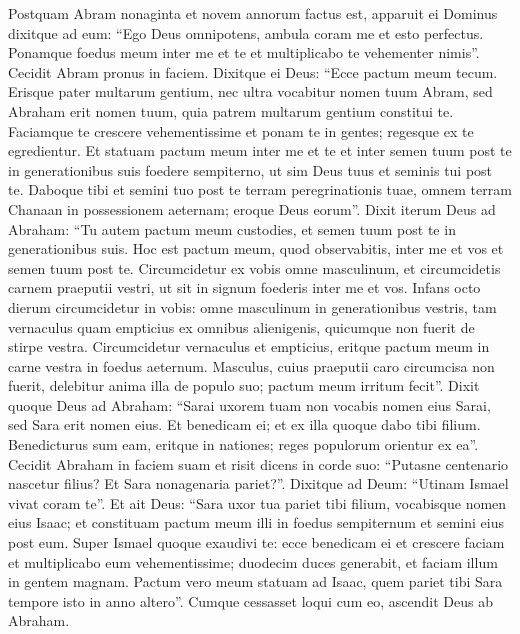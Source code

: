 \begin{biblechapter}
\begin{biblechapter}
\begin{biblechapter}
\begin{biblechapter}
\begin{biblechapter}
\begin{biblechapter}
\begin{biblechapter}
\begin{biblechapter}
\begin{biblechapter}
\begin{biblechapter}
\begin{biblechapter}
\begin{biblechapter}
\begin{biblechapter}
\begin{biblechapter}
\begin{biblechapter}
\begin{biblechapter}
\begin{biblechapter}
\verse Postquam Abram nonaginta et novem annorum factus est, apparuit ei Dominus dixitque ad eum: “Ego Deus omnipotens, ambula coram me et esto perfectus. 
\verse Ponamque foedus meum inter me et te et multiplicabo te vehementer nimis”. 
\verse Cecidit Abram pronus in faciem. 
\verse Dixitque ei Deus: “Ecce pactum meum tecum. Erisque pater multarum gentium, 
\verse nec ultra vocabitur nomen tuum Abram, sed Abraham erit nomen tuum, quia patrem multarum gentium constitui te. 
\verse Faciamque te crescere vehementissime et ponam te in gentes; regesque ex te egredientur. 
\verse Et statuam pactum meum inter me et te et inter semen tuum post te in generationibus suis foedere sempiterno, ut sim Deus tuus et seminis tui post te. 
\verse Daboque tibi et semini tuo post te terram peregrinationis tuae, omnem terram Chanaan in possessionem aeternam; eroque Deus eorum”.
 \verse Dixit iterum Deus ad Abraham: “Tu autem pactum meum custodies, et semen tuum post te in generationibus suis. 
\verse Hoc est pactum meum, quod observabitis, inter me et vos et semen tuum post te. Circumcidetur ex vobis omne masculinum, 
 \verse et circumcidetis carnem praeputii vestri, ut sit in signum foederis inter me et vos. 
\verse Infans octo dierum circumcidetur in vobis: omne masculinum in generationibus vestris, tam vernaculus quam empticius ex omnibus alienigenis, quicumque non fuerit de stirpe vestra. 
\verse Circumcidetur vernaculus et empticius, eritque pactum meum in carne vestra in foedus aeternum. \verse Masculus, cuius praeputii caro circumcisa non fuerit, delebitur anima illa de populo suo; pactum meum irritum fecit”.
 \verse Dixit quoque Deus ad Abraham: “Sarai uxorem tuam non vocabis nomen eius Sarai, sed Sara erit nomen eius. 
\verse Et benedicam ei; et ex illa quoque dabo tibi filium. Benedicturus sum eam, eritque in nationes; reges populorum orientur ex ea”. 
\verse Cecidit Abraham in faciem suam et risit dicens in corde suo: “Putasne centenario nascetur filius? Et Sara nonagenaria pariet?”. 
\verse Dixitque ad Deum: “Utinam Ismael vivat coram te”. 
\verse Et ait Deus: “Sara uxor tua pariet tibi filium, vocabisque nomen eius Isaac; et constituam pactum meum illi in foedus sempiternum et semini eius post eum. 
\verse Super Ismael quoque exaudivi te: ecce benedicam ei et crescere faciam et multiplicabo eum vehementissime; duodecim duces generabit, et faciam illum in gentem magnam. 
 \verse Pactum vero meum statuam ad Isaac, quem pariet tibi Sara tempore isto in anno altero”. 
\verse Cumque cessasset loqui cum eo, ascendit Deus ab Abraham.

\end{biblechapter}
\end{biblechapter}
\end{biblechapter}
\end{biblechapter}
\end{biblechapter}
\end{biblechapter}
\end{biblechapter}
\end{biblechapter}
\end{biblechapter}
\end{biblechapter}
\end{biblechapter}
\end{biblechapter}
\end{biblechapter}
\end{biblechapter}
\end{biblechapter}
\end{biblechapter}
\end{biblechapter}
